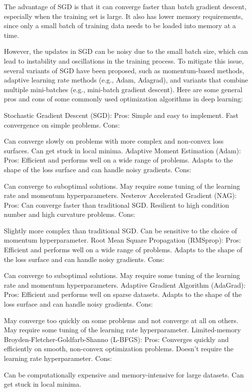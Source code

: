 The advantage of SGD is that it can converge faster than batch gradient descent, especially when the training set is large. It also has lower memory requirements, since only a small batch of training data needs to be loaded into memory at a time.

However, the updates in SGD can be noisy due to the small batch size, which can lead to instability and oscillations in the training process. To mitigate this issue, several variants of SGD have been proposed, such as momentum-based methods, adaptive learning rate methods (e.g., Adam, Adagrad), and variants that combine multiple mini-batches (e.g., mini-batch gradient descent).
Here are some general pros and cons of some commonly used optimization algorithms in deep learning:

Stochastic Gradient Descent (SGD):
Pros:
Simple and easy to implement.
Fast convergence on simple problems.
Cons:

Can converge slowly on problems with more complex and non-convex loss surfaces.
Can get stuck in local minima.
Adaptive Moment Estimation (Adam):
Pros:
Efficient and performs well on a wide range of problems.
Adapts to the shape of the loss surface and can handle noisy gradients.
Cons:

Can converge to suboptimal solutions.
May require some tuning of the learning rate and momentum hyperparameters.
Nesterov Accelerated Gradient (NAG):
Pros:
Can converge faster than traditional SGD.
Resilient to high condition number and high curvature problems.
Cons:

Slightly more complex than traditional SGD.
Can be sensitive to the choice of momentum hyperparameter.
Root Mean Square Propagation (RMSprop):
Pros:
Efficient and performs well on a wide range of problems.
Adapts to the shape of the loss surface and can handle noisy gradients.
Cons:

Can converge to suboptimal solutions.
May require some tuning of the learning rate and momentum hyperparameters.
Adaptive Gradient Algorithm (AdaGrad):
Pros:
Efficient and performs well on sparse datasets.
Adapts to the shape of the loss surface and can handle noisy gradients.
Cons:

May converge too quickly on some problems and not converge at all on others.
May require some tuning of the learning rate hyperparameter.
Limited-memory Broyden-Fletcher-Goldfarb-Shanno (L-BFGS):
Pros:
Converges quickly and efficiently on smooth, non-convex optimization problems.
Doesn't require the learning rate hyperparameter.
Cons:

Can be computationally expensive and memory-intensive for large datasets.
Can get stuck in local minima.